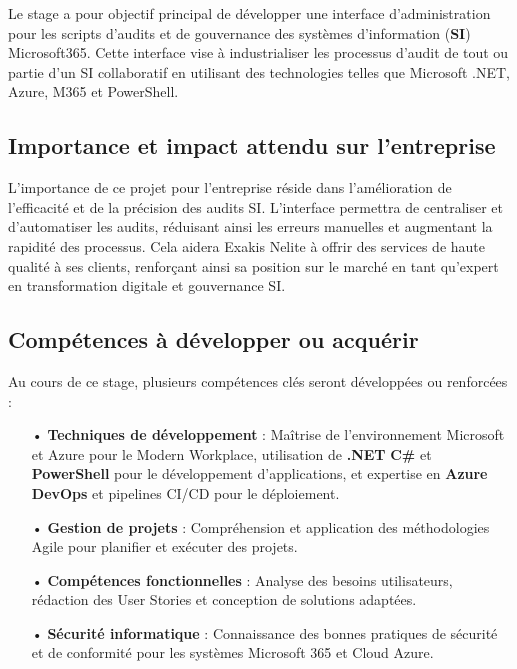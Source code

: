 Le stage a pour objectif principal de développer une interface d'administration pour les scripts d'audits et de gouvernance des systèmes d'information (\textbf{SI}) Microsoft365. Cette interface vise à industrialiser les processus d'audit de tout ou partie d'un SI collaboratif en utilisant des technologies telles que Microsoft .NET, Azure, M365 et PowerShell.

\subsection{Importance et impact attendu sur l’entreprise}

L'importance de ce projet pour l'entreprise réside dans l'amélioration de l'efficacité et de la précision des audits SI. L'interface permettra de centraliser et d'automatiser les audits, réduisant ainsi les erreurs manuelles et augmentant la rapidité des processus. Cela aidera Exakis Nelite à offrir des services de haute qualité à ses clients, renforçant ainsi sa position sur le marché en tant qu'expert en transformation digitale et gouvernance SI.

\newpage

\subsection{Compétences à développer ou acquérir}

Au cours de ce stage, plusieurs compétences clés seront développées ou renforcées :
\begin{itemize}
    \item[•] \textbf{Techniques de développement} : Maîtrise de l'environnement Microsoft et Azure pour le Modern Workplace, utilisation de \textbf{.NET} \textbf{C\#} et \textbf{PowerShell} pour le développement d'applications, et expertise en \textbf{Azure} \textbf{DevOps} et pipelines CI/CD pour le déploiement.
    \item[•] \textbf{Gestion de projets} : Compréhension et application des méthodologies Agile pour planifier et exécuter des projets.
    \item[•] \textbf{Compétences fonctionnelles} : Analyse des besoins utilisateurs, rédaction des User Stories et conception de solutions adaptées.
    \item[•] \textbf{Sécurité informatique} : Connaissance des bonnes pratiques de sécurité et de conformité pour les systèmes Microsoft 365 et Cloud Azure.
\end{itemize}

